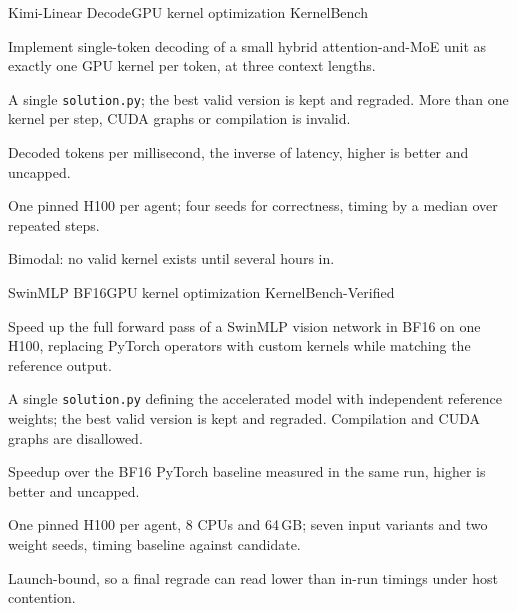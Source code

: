 \documentclass[numbers,10pt]{arxiv}
\newenvironment{cardfields}{\begin{description}[style=sameline, leftmargin=5.9em, labelwidth=5.5em, labelsep=0.4em,
  font=\sffamily\footnotesize\bfseries, itemsep=1pt, parsep=0pt, topsep=1pt, partopsep=0pt]\small}{\end{description}}
\begin{document}
\begin{taskcard}{Kimi-Linear Decode}{GPU kernel optimization \textperiodcentered{} KernelBench}
\begin{cardfields}
\item[Goal] Implement single-token decoding of a small hybrid attention-and-MoE unit as exactly one GPU kernel per token, at three context lengths.
\item[Submission] A single \texttt{solution.py}; the best valid version is kept and regraded. More than one kernel per step, CUDA graphs or compilation is invalid.
\item[Score] Decoded tokens per millisecond, the inverse of latency, higher is better and uncapped.
\item[Judge] One pinned H100 per agent; four seeds for correctness, timing by a median over repeated steps.
\item[Notes] Bimodal: no valid kernel exists until several hours in.
\end{cardfields}
\end{taskcard}
\begin{taskcard}{SwinMLP BF16}{GPU kernel optimization \textperiodcentered{} KernelBench-Verified}
\begin{cardfields}
\item[Goal] Speed up the full forward pass of a SwinMLP vision network in BF16 on one H100, replacing PyTorch operators with custom kernels while matching the reference output.
\item[Submission] A single \texttt{solution.py} defining the accelerated model with independent reference weights; the best valid version is kept and regraded. Compilation and CUDA graphs are disallowed.
\item[Score] Speedup over the BF16 PyTorch baseline measured in the same run, higher is better and uncapped.
\item[Judge] One pinned H100 per agent, 8 CPUs and 64\,GB; seven input variants and two weight seeds, timing baseline against candidate.
\item[Notes] Launch-bound, so a final regrade can read lower than in-run timings under host contention.
\end{cardfields}
\end{taskcard}
\end{document}

